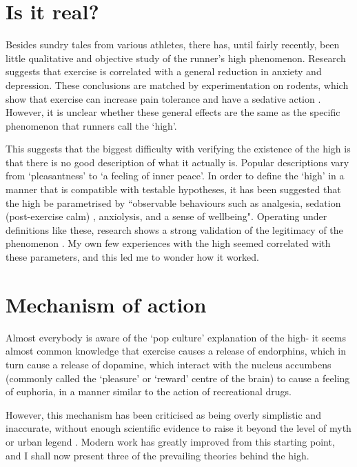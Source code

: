 \documentclass[]{article}
\begin{document}
\section{Is it real?}

	Besides sundry tales from various athletes, there has, until fairly recently, been little qualitative and objective study of the runner's high phenomenon. Research suggests \citep{mood, mood2} that exercise is correlated with a general reduction in anxiety and depression. These conclusions are matched by experimentation on rodents, which show that exercise can increase pain tolerance and have a sedative action \citep{endocan,ratrun}. However, it is unclear whether these general effects are the same as the specific phenomenon that runners call the `high'.
	
	This suggests that the biggest difficulty with verifying the existence of the high is that there is no good description of what it actually is. Popular descriptions vary from `pleasantness' to `a feeling of inner peace'. In order to define the `high' in a manner that is compatible with testable hypotheses, it has been suggested \citep{endocan} that the high be parametrised by ``observable behaviours such as analgesia, sedation (post-exercise calm) , anxiolysis, and a sense of wellbeing". Operating under definitions like these, research shows a strong validation of the legitimacy of the phenomenon \citep{endocan, opioid}. My own few experiences with the high seemed correlated with these parameters, and this led me to wonder how it worked.
	
\section{Mechanism of action}
	Almost everybody is aware of the `pop culture' explanation of the high- it seems almost common knowledge that exercise causes a release of endorphins, which in turn cause a release of dopamine, which interact with the nucleus accumbens (commonly called the `pleasure' or `reward' centre of the brain) to cause a feeling of euphoria, in a manner similar to the action of recreational drugs.
	
	However, this mechanism has been criticised as being overly simplistic and inaccurate, without enough scientific evidence to raise it beyond the level of myth or urban legend \citep{fiction}. Modern work has greatly improved from this starting point, and I shall now present three of the prevailing theories behind the high.
	
\end{document}
